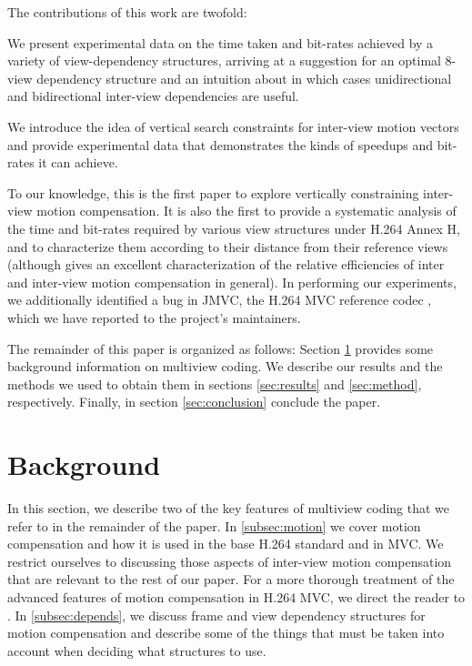 \documentclass{sig-alternate-05-2015}
\begin{document}
The contributions of this work are twofold: \begin{compactitem}
\item We present experimental data on the time taken and bit-rates achieved by a
variety of view-dependency structures, arriving at a suggestion for an optimal
8-view dependency structure and an intuition about in which cases unidirectional
and bidirectional inter-view dependencies are useful.
\item We introduce the idea of vertical search constraints for inter-view motion
vectors and provide experimental data that demonstrates the kinds of speedups
and bit-rates it can achieve. \end{compactitem} To our knowledge, this is the
first paper to explore vertically constraining inter-view motion compensation.
It is also the first to provide a systematic analysis of the time and bit-rates
required by various view structures under H.264 Annex H, and to  characterize
them according to their distance from their reference views (although
\cite{merkle:efficient} gives an excellent characterization of the relative
efficiencies of inter and inter-view motion compensation in general). In
performing our experiments, we additionally identified a bug in JMVC, the
H.264 MVC reference codec \cite{schwarz:jmvc}, which we have reported to the
project's maintainers.

The remainder of this paper is organized as follows: Section
\ref{sec:background} provides some background information on multiview coding.
We describe our results and the methods we used to obtain them in sections
\ref{sec:results} and \ref{sec:method}, respectively. Finally, in section
\ref{sec:conclusion} conclude the paper.

\section{Background} %
\label{sec:background} %

In this section, we describe two of the key features of multiview coding that
we refer to in the remainder of the paper. In \ref{subsec:motion} we cover
motion compensation and how it is used in the base H.264 standard and in MVC.
We restrict ourselves to discussing those aspects of inter-view motion
compensation that are relevant to the rest of our paper. For a more thorough
treatment of the advanced features of motion compensation in H.264 MVC, we
direct the reader to \cite{vetro:overview}. In \ref{subsec:depends}, we discuss
frame and view dependency structures for motion compensation and describe some
of the things that must  be taken into account when deciding what structures to
use.
\end{document}
